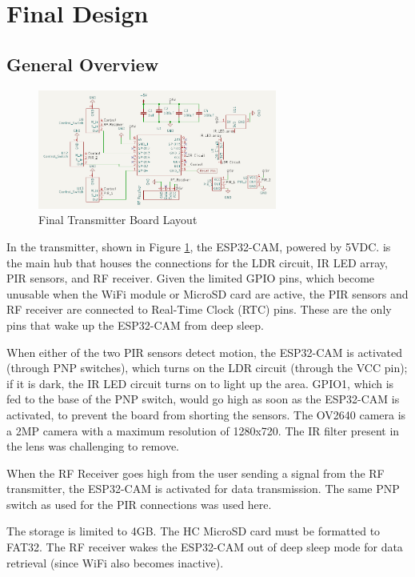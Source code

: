 \documentclass[class=report,11pt,crop=false]{standalone}
\begin{document}
\section{Final Design}\label{sc: HW_FD}

\subsection{General Overview}
\begin{figure}[h]
\centering
\includegraphics[width=0.7\textwidth]{Images/Transmitter_layout.png}
\caption{Final Transmitter Board Layout}
\label{fig:T_Schem}
\end{figure}

In the transmitter, shown in Figure \ref{fig:T_Schem}, the ESP32-CAM, powered by 5VDC. is the main hub that houses the connections for the LDR circuit, IR LED array, PIR sensors, and RF receiver. 
Given the limited GPIO pins, which become unusable when the WiFi module or MicroSD card are active, the PIR sensors and RF receiver are connected to Real-Time Clock (RTC) pins. These are the only pins that wake up the ESP32-CAM from deep sleep. 

When either of the two PIR sensors detect motion, the ESP32-CAM is activated (through PNP switches), which turns on the LDR circuit (through the VCC pin); if it is dark, the IR LED circuit turns on to light up the area. GPIO1, which is fed to the base of the PNP switch, would go high as soon as the ESP32-CAM is activated, to prevent the board from shorting the sensors. The OV2640 camera is a 2MP camera with a maximum resolution of 1280x720. The IR filter present in the lens was challenging to remove. 

When the RF Receiver goes high from the user sending a signal from the RF transmitter, the ESP32-CAM is activated for data transmission. The same PNP switch as used for the PIR connections was used here. 

The storage is limited to 4GB. The HC MicroSD card must be formatted to FAT32. The RF receiver wakes the ESP32-CAM out of deep sleep mode for data retrieval (since WiFi also becomes inactive). 
\end{document}
